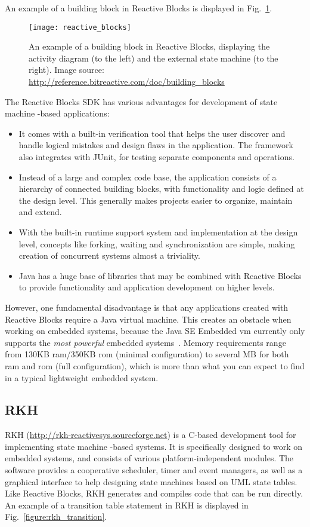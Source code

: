 An example of a building block in Reactive Blocks is displayed in Fig.~\ref{figure:reactive_blocks}.

\begin{figure}[h]
	\centering
	\texttt{[image: reactive\_blocks]}
	\caption[A building block in Reactive Blocks]{An example of a building block in Reactive Blocks, displaying the activity diagram (to the left) and the external state machine (to the right). Image source: \url{http://reference.bitreactive.com/doc/building_blocks} \label{figure:reactive_blocks} }
\end{figure}

The Reactive Blocks SDK has various advantages for development of state machine -based applications:
\begin{itemize}
	\item It comes with a built-in verification tool that helps the user discover and handle logical mistakes and design flaws in the application. The framework also integrates with JUnit, for testing separate components and operations.
	\item Instead of a large and complex code base, the application consists of a hierarchy of connected building blocks, with functionality and logic defined at the design level. This generally makes projects easier to organize, maintain and extend.
	\item With the built-in runtime support system and implementation at the design level, concepts like forking, waiting and synchronization are simple, making creation of concurrent systems almost a triviality.
	\item Java has a huge base of libraries that may be combined with Reactive Blocks to provide functionality and application development on higher levels.
\end{itemize}

However, one fundamental disadvantage is that any applications created with Reactive Blocks require a Java virtual machine. This creates an obstacle when working on embedded systems, because the Java SE Embedded \gls{vm} currently only supports the \emph{most powerful} embedded systems~\cite{website:java_embedded_vm}. Memory requirements range from 130KB \gls{ram}/350KB \gls{rom} (minimal configuration) to several MB for both \gls{ram} and \gls{rom} (full configuration), which is more than what you can expect to find in a typical lightweight embedded system.

\subsection{RKH}
\label{sec:rkh_state_machine}
RKH (\url{http://rkh-reactivesys.sourceforge.net}) is a C-based development tool for implementing state machine -based systems. It is specifically designed to work on embedded systems, and consists of various platform-independent modules. The software provides a cooperative scheduler, timer and event managers, as well as a graphical interface to help designing state machines based on UML state tables. Like Reactive Blocks, RKH generates and compiles code that can be run directly. An example of a transition table statement in RKH is displayed in Fig.~\ref{figure:rkh_transition}.

